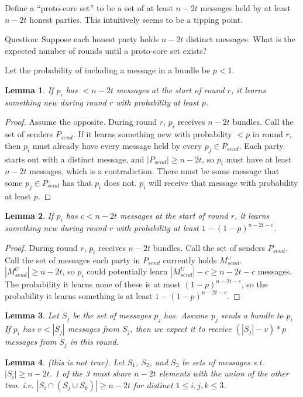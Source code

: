 \documentclass{article}
\newtheorem{lemma}{Lemma}
\begin{document}
Define a ``proto-core set'' to be a set of at least $n-2t$ messages held by at least $n-2t$ honest parties. This intuitively seems to be a tipping point.
    
Question: Suppose each honest party holds $n-2t$ distinct messages. What is the expected number of rounds until a proto-core set exists?

Let the probability of including a message in a bundle be $p < 1$.
\begin{lemma}
If $p_i$ has $< n - 2t$ messages at the start of round $r$, it learns something new during round $r$ with probability at least $p$.
\end{lemma}
\begin{proof}
Assume the opposite. During round $r$, $p_i$ receives $n - 2t$ bundles. Call the set of senders $P_{send}$. If it learns something new with probability $< p$ in round $r$, then $p_i$ must already have every message held by every $p_j \in P_{send}$. Each party starts out with a distinct message, and $|P_{send}| \geq n - 2t$, so $p_i$ must have at least $n -2t$ messages, which is a contradiction. There must be some message that some $p_j \in P_{send}$ has that $p_i$ does not. $p_i$ will receive that message with probability at least $p$.
\end{proof}
\begin{lemma}
If $p_i$ has $c < n - 2t$ messages at the start of round $r$, it learns something new during round $r$ with probability at least $1 - (1 - p)^{n - 2t - c}$.
\end{lemma}
\begin{proof}
During round $r$, $p_i$ receives $n - 2t$ bundles. Call the set of senders $P_{send}$. Call the set of messages each party in $P_{send}$ currently holds $M_{send}^\cup$. $|M^U_{send}| \geq n - 2t$, so $p_i$ could potentially learn $|M^U_{send}| - c \geq n - 2t - c$ messages. The probability it learns none of these is at most $(1 - p)^{n - 2t - c}$, so the probability it learns something is at least $1 - (1 - p)^{n - 2t - c}$.
\end{proof}

\begin{lemma}
Let $S_j$ be the set of messages $p_j$ has. Assume $p_j$ sends a bundle to $p_i$ If $p_i$ has $v < |S_j|$ messages from $S_j$, then we expect it to receive $(|S_j| - v) * p$ messages from $S_j$ in this round.
\end{lemma}

\begin{lemma}
(this is not true). Let $S_1$, $S_2$, and $S_3$ be sets of messages s.t. $|S_i| \geq n - 2t$. 1 of the 3 must share $n - 2t$ elements with the union of the other two. i.e. $|S_i \cap (S_j \cup S_k)| \geq n - 2t$ for distinct $1 \leq i, j, k \leq 3$.
\end{lemma}
\end{document}
